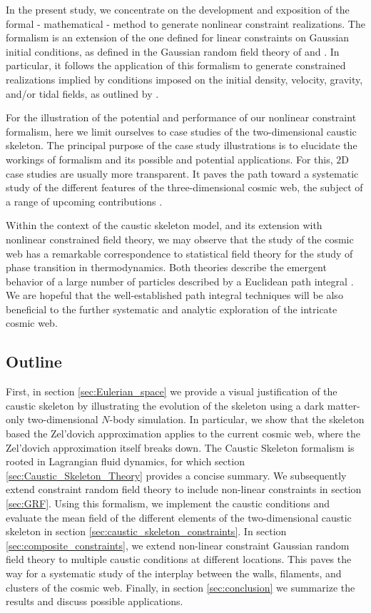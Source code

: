 \documentclass[a4paper, 11pt]{article}
\begin{document}
In the present study, we concentrate on the development and exposition of the formal - mathematical - method to generate nonlinear constraint realizations. The formalism is an extension of the one defined for linear constraints on Gaussian initial conditions, as defined in the Gaussian random field theory of \cite{Bertschinger:1987} and \cite{Hoffman:1991}. In particular, it follows the application of this formalism to generate constrained realizations implied by conditions imposed on the initial density, velocity, gravity, and/or tidal fields, as outlined by \cite{Weygaert:1996} \cite[also see][]{Haarlem:1993}.

For the illustration of the potential and performance of our nonlinear constraint formalism, here we limit ourselves to case studies of the two-dimensional caustic skeleton. The principal purpose of the case study illustrations is to elucidate the workings of formalism and its possible and potential applications. For this, $2$D case studies are usually more transparent. It paves the path toward a systematic study of the different features of the three-dimensional cosmic web, the subject of a range of upcoming contributions \cite{Feldbrugge:2022}.

\bigskip
Within the context of the caustic skeleton model, and its extension with nonlinear constrained field theory, we may observe that the study of the cosmic web has a remarkable correspondence to statistical field theory for the study of phase transition in thermodynamics. Both theories describe the emergent behavior of a large number of particles described by a Euclidean path integral \cite{Feynman:1965}. We are hopeful that the well-established path integral techniques will be also beneficial to the further systematic and analytic exploration of the intricate cosmic web.

\subsection{Outline} 
First, in section \ref{sec:Eulerian_space} we provide a visual justification of the caustic skeleton by illustrating the evolution of the skeleton using a dark matter-only two-dimensional $N$-body simulation. In particular, we show that the skeleton based the Zel'dovich approximation applies to the current cosmic web, where the Zel'dovich approximation itself breaks down. The Caustic Skeleton formalism is rooted in Lagrangian fluid dynamics, for which section \ref{sec:Caustic_Skeleton_Theory} provides a concise summary. We subsequently extend constraint random field theory to include non-linear constraints in section \ref{sec:GRF}. Using this formalism, we implement the caustic conditions and evaluate the mean field of the different elements of the two-dimensional caustic skeleton in section \ref{sec:caustic_skeleton_constraints}. In section \ref{sec:composite_constraints}, we extend non-linear constraint Gaussian random field theory to multiple caustic conditions at different locations. This paves the way for a systematic study of the interplay between the walls, filaments, and clusters of the cosmic web. Finally, in section \ref{sec:conclusion} we summarize the results and discuss possible applications.
\end{document}
